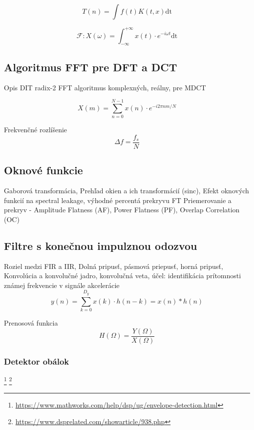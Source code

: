 \begin{equation}
T(n) = \int{f(t) K(t,x) \mathrm{dt}}
\end{equation}

\begin{equation}
\mathcal{F}: X(\omega) = \int_{-\infty}^{+\infty}{x(t) \cdot e^{-i\omega t} \mathrm{dt}}
\end{equation}

\subsection{Algoritmus FFT pre DFT a DCT}
Opis DIT radix-2 FFT algoritmus komplexných, reálny, pre MDCT \cite{fft-blackbox}

\begin{equation}
X(m) = \sum_{n = 0}^{N-1}{x(n) \cdot e^{-i2\pi n m / N}}
\end{equation}

Frekvenčné rozlíšenie
\begin{equation}
\Delta f = \frac{f_s}{N}
\end{equation}

\subsection{Oknové funkcie}
Gaborová transformácia, Prehľad okien a ich transformácií (sinc), Efekt oknových funkcií na spectral leakage, výhodné percentá prekryvu FT 	\cite{understanding-dsp} \cite{spectral-density-estimation}
Priemerovanie a prekryv - Amplitude Flatness (AF), Power Flatness (PF), Overlap Correlation (OC)

\subsection{Filtre s konečnou impulznou odozvou}
Roziel medzi FIR a IIR, Dolná pripusť, pásmová priepusť, horná pripusť,
 Konvolúcia a konvolučné jadro, konvolučná veta, účel: identifikácia prítomnosti známej frekvencie v signále akcelerácie
\begin{equation}
y(n) = \sum_{k=0}^{D_y}{x(k) \cdot h(n-k)} = x(n) * h(n)
\end{equation}

Prenosová funkcia
\begin{equation}
H(\Omega) = \frac{Y(\Omega)}{X(\Omega)}
\end{equation}	

\subsubsection{Detektor obálok}
\footnote{\url{https://www.mathworks.com/help/dsp/ug/envelope-detection.html}}
\footnote{\url{https://www.dsprelated.com/showarticle/938.php}}

